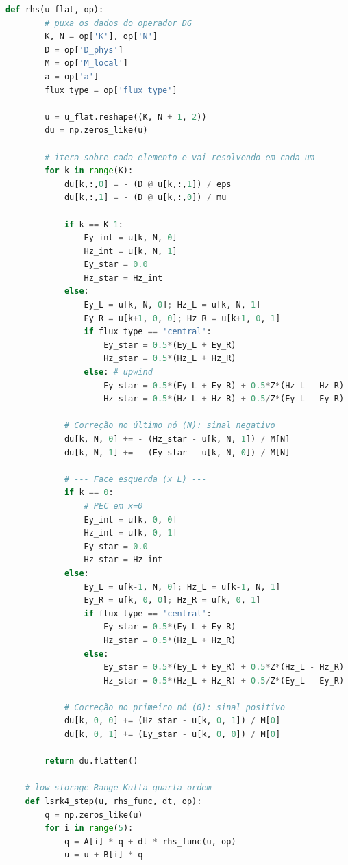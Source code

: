 \begin{anexosenv}
\begin{lstlisting}[language=Python, breaklines=true, basicstyle=\tiny]
    def rhs(u_flat, op):
        # puxa os dados do operador DG
        K, N = op['K'], op['N']
        D = op['D_phys']
        M = op['M_local']
        a = op['a']
        flux_type = op['flux_type']
        
        u = u_flat.reshape((K, N + 1, 2))
        du = np.zeros_like(u)
        
        # itera sobre cada elemento e vai resolvendo em cada um
        for k in range(K):
            du[k,:,0] = - (D @ u[k,:,1]) / eps
            du[k,:,1] = - (D @ u[k,:,0]) / mu
            
            if k == K-1:
                Ey_int = u[k, N, 0]
                Hz_int = u[k, N, 1]
                Ey_star = 0.0
                Hz_star = Hz_int
            else:
                Ey_L = u[k, N, 0]; Hz_L = u[k, N, 1]
                Ey_R = u[k+1, 0, 0]; Hz_R = u[k+1, 0, 1]
                if flux_type == 'central':
                    Ey_star = 0.5*(Ey_L + Ey_R)
                    Hz_star = 0.5*(Hz_L + Hz_R)
                else: # upwind
                    Ey_star = 0.5*(Ey_L + Ey_R) + 0.5*Z*(Hz_L - Hz_R)
                    Hz_star = 0.5*(Hz_L + Hz_R) + 0.5/Z*(Ey_L - Ey_R)
            
            # Correção no último nó (N): sinal negativo
            du[k, N, 0] += - (Hz_star - u[k, N, 1]) / M[N]
            du[k, N, 1] += - (Ey_star - u[k, N, 0]) / M[N]
            
            # --- Face esquerda (x_L) ---
            if k == 0:
                # PEC em x=0
                Ey_int = u[k, 0, 0]
                Hz_int = u[k, 0, 1]
                Ey_star = 0.0
                Hz_star = Hz_int
            else:
                Ey_L = u[k-1, N, 0]; Hz_L = u[k-1, N, 1]
                Ey_R = u[k, 0, 0]; Hz_R = u[k, 0, 1]
                if flux_type == 'central':
                    Ey_star = 0.5*(Ey_L + Ey_R)
                    Hz_star = 0.5*(Hz_L + Hz_R)
                else:
                    Ey_star = 0.5*(Ey_L + Ey_R) + 0.5*Z*(Hz_L - Hz_R)
                    Hz_star = 0.5*(Hz_L + Hz_R) + 0.5/Z*(Ey_L - Ey_R)
                    
            # Correção no primeiro nó (0): sinal positivo
            du[k, 0, 0] += (Hz_star - u[k, 0, 1]) / M[0]
            du[k, 0, 1] += (Ey_star - u[k, 0, 0]) / M[0]
            
        return du.flatten()

    # low storage Range Kutta quarta ordem
    def lsrk4_step(u, rhs_func, dt, op):
        q = np.zeros_like(u)
        for i in range(5):
            q = A[i] * q + dt * rhs_func(u, op)
            u = u + B[i] * q
            

\end{lstlisting}
\end{anexosenv}
